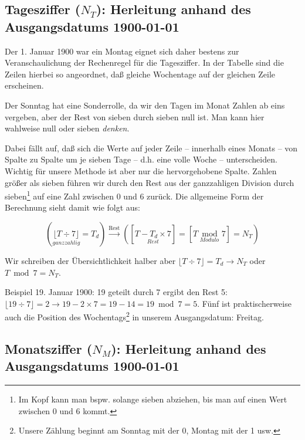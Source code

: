 \documentclass[version=last,paper=A4,fontsize=11pt,DIV=18]{scrartcl}
\newenvironment{nscenter}
{\parskip=0pt\par\nopagebreak\centering}
{\par\noindent\ignorespacesafterend}
\begin{document}
\subsection*{Tagesziffer ($N_T$): Herleitung anhand des Ausgangsdatums 1900-01-01}

Der 1. Januar 1900 war ein Montag eignet sich daher bestens zur Veranschaulichung der Rechenregel für die Tagesziffer. In der Tabelle sind die Zeilen hierbei so angeordnet, daß gleiche Wochentage auf der gleichen Zeile erscheinen.

\begin{center}
\end{center}

Der Sonntag hat eine Sonderrolle, da wir den Tagen im Monat Zahlen ab eins vergeben, aber der Rest von sieben durch sieben null ist. Man kann hier wahlweise null oder sieben \emph{denken}.\marginpar{\faLightbulbO}

Dabei fällt auf, daß sich die Werte auf jeder Zeile -- innerhalb eines Monats -- von Spalte zu Spalte um je sieben Tage -- d.h. eine volle Woche -- unterscheiden. Wichtig für unsere Methode ist aber nur die hervorgehobene Spalte. Zahlen größer als sieben führen wir durch den Rest aus der ganzzahligen Division durch sieben\footnote{Im Kopf kann man bspw. solange sieben abziehen, bis man auf einen Wert zwischen 0 und 6 kommt.} auf eine Zahl zwischen 0 und 6 zurück. Die allgemeine Form der Berechnung sieht damit wie folgt aus:

\begin{nscenter}
    \[
    \left( \underset{ganzzahlig}{\lfloor T \div 7 \rfloor} = T_d \right) \xrightarrow{\text{Rest}} \left( \left[ \underset{Rest}{T - T_d \times 7} \right] = \left[ \underset{Modulo}{T \bmod 7} \right] = N_T \right)
    \]
\end{nscenter}

Wir schreiben der Übersichtlichkeit halber aber $\lfloor T \div 7 \rfloor = T_d \rightarrow N_T$ oder $T \bmod 7 = N_T$.

Beispiel 19. Januar 1900: 19 geteilt durch 7 ergibt den Rest 5: $\lfloor 19 \div 7 \rfloor = 2 \rightarrow 19 - 2 \times 7 = 19 - 14 = 19 \bmod 7 = 5$. Fünf ist praktischerweise auch die Position des Wochentags\footnote{Unsere Zählung beginnt am Sonntag mit der 0, Montag mit der 1 usw.} in unserem Ausgangsdatum: Freitag.

\subsection*{Monatsziffer ($N_M$): Herleitung anhand des Ausgangsdatums 1900-01-01}
\end{document}
